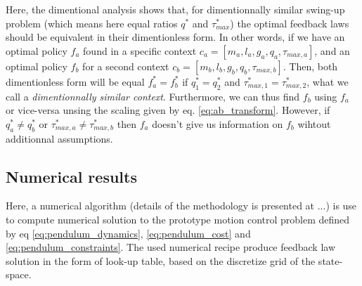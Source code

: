 Here, the dimentional analysis shows that, for dimentionnally similar swing-up problem (which means here equal ratios $q^*$ and $\tau_{max}^*$) the optimal feedback laws should be equivalent in their dimentionless form. In other words, if we have an optimal policy $f_a$ found in a specific context $c_a = [m_a,l_a,g_a,q_a,\tau_{max,a}]$, and an optimal policy $f_b$ for a second context $c_b = [m_b,l_b,g_b,q_b,\tau_{max,b}]$. Then, both dimentionless form will be equal $f_a^*=f_b^*$ if $q^*_1 = q^*_2$ and $\tau_{max,1}^* = \tau_{max,2}^*$, what we call a \textit{dimentionnally similar context}. Furthermore, we can thus find $f_b$ using $f_a$ or vice-versa unsing the scaling given by eq. \eqref{eq:ab_transform}. However, if $q^*_a \neq q^*_b$ or $\tau_{max,a}^* \neq \tau_{max,b}^*$ then $f_a$ doesn't give us information on $f_b$ wihtout additionnal assumptions. 

\subsection{Numerical results}

Here, a numerical algorithm (details of the methodology is presented at ...) is use to compute numerical solution to the prototype motion control problem defined by eq \eqref{eq:pendulum_dynamics}, \eqref{eq:pendulum_cost} and \eqref{eq:pendulum_constraints}. The used numerical recipe produce feedback law solution in the form of look-up table, based on the discretize grid of the state-space. 

